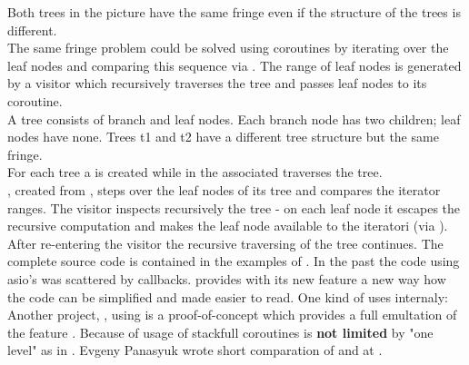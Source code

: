 Both trees in the picture have the same fringe even if the structure of the trees
is different.\\
\newline
The same fringe problem could be solved using coroutines by iterating over the leaf
nodes and comparing this sequence via . The range of leaf
nodes is generated by a visitor which recursively traverses the tree and passes
leaf nodes to its coroutine.\\
\newline
{}
A tree consists of branch and leaf nodes. Each branch node has two children;
leaf nodes have none. Trees t1 and t2 have a different tree structure but the
same fringe.\\
For each tree a \pullcoro is created while in the associated \corofunction
{} traverses the tree.\\
\coroiterator, created from \pullcoro, steps over the leaf nodes of its tree and
 compares the iterator ranges.
\newline
\newline
{}
The visitor inspects recursively the tree - on each leaf node it escapes the recursive
computation and makes the leaf node available to the iteratori (via \pushcoro).
After re-entering the visitor the recursive traversing of the tree continues.
\newline
The complete source code is contained in the examples of \boostcoroutine.
\newline
\newline
In the past the code using asio's \asyncops was scattered by callbacks. \boostasio
provides with its new feature \asyncres a new way how the code can be simplified and
made easier to read. One kind of \asyncres uses \boostcoroutine internaly:
\newline
\newline
Another project, \awaitemu, using \boostcoroutine is a proof-of-concept which provides
a full emultation of the \csharp feature \await. Because of usage of stackfull coroutines
\await is \textbf{not limited} by "one level" as in \csharp.
Evgeny Panasyuk wrote short comparation of \await and \coro at \channelnine.
